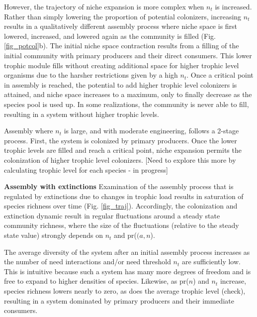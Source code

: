 \documentclass[twocolumn,preprintnumbers,amsmath,amssymb,superscriptaddress]{revtex4-1}
\begin{document}
However, the trajectory of niche expansion is more complex when $n_t$ is increased.
Rather than simply lowering the proportion of potential colonizers, increasing $n_t$ results in a qualitatively different assembly process where niche space is first lowered, increased, and lowered again as the community is filled (Fig. \ref{fig_potcol}b).
The initial niche space contraction results from a filling of the initial community with primary producers and their direct consumers.
This lower trophic module fills without creating additional space for higher trophic level organisms due to the harsher restrictions given by a high $n_t$.
Once a critical point in assembly is reached, the potential to add higher trophic level colonizers is attained, and niche space increases to a maximum, only to finally decrease as the species pool is used up.
In some realizations, the community is never able to fill, resulting in a system without higher trophic levels.

Assembly where $n_t$ is large, and with moderate engineering, follows a 2-stage process.
First, the system is colonized by primary producers.
Once the lower trophic levels are filled and reach a critical point, niche expansion permits the colonization of higher trophic level colonizers.
[Need to explore this more by calculating trophic level for each species - in progress]











{\bf Assembly with extinctions}
Examination of the assembly process that is regulated by extinctions due to changes in trophic load results in saturation of species richness over time (Fig. \ref{fig_traj}).
Accordingly, the colonization and extinction dynamic result in regular fluctuations around a steady state community richness, where the size of the fluctuations (relative to the steady state value) strongly depends on $n_t$ and pr($(a,n$).

The average diversity of the system after an initial assembly process increases as the number of need interactions and/or need threshold $n_t$ are sufficiently low.
This is intuitive because such a system has many more degrees of freedom and is free to expand to higher densities of species.
Likewise, as pr($n$) and $n_t$ increase, species richness lowers nearly to zero, as does the average trophic level (check), resulting in a system dominated by primary producers and their immediate consumers.
\end{document}
